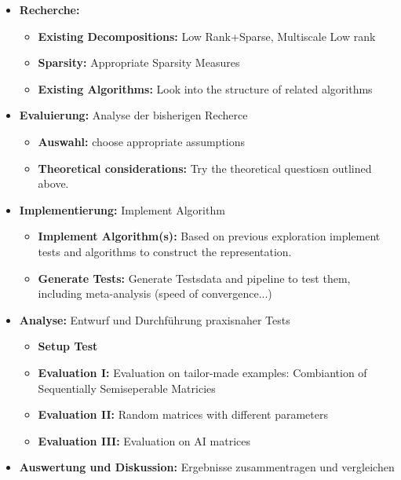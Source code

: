 \documentclass[lang=ngerman,inputenc=utf8,fontsize=10pt]{ldvarticle}
\begin{document}
\begin{itemize}
	\item \textbf{Recherche:}
	\begin{itemize}
			\item \textbf{Existing Decompositions:} Low Rank+Sparse, Multiscale Low rank \cite{chandrasekaran_sparse_2009,ong_beyond_2016,yu_compressing_2017}
			\item \textbf{Sparsity:} Appropriate Sparsity Measures \cite{ulfarsson_sparse_2015,parekh_improved_2017}
			\item \textbf{Existing Algorithms:} Look into the structure of related algorithms
		\end{itemize}
	\item \textbf{Evaluierung:} Analyse der bisherigen Recherce
		\begin{itemize}
			\item \textbf{Auswahl:} choose appropriate assumptions
			\item \textbf{Theoretical considerations:} Try the theoretical questiosn outlined above.
		\end{itemize}
	\item \textbf{Implementierung:} Implement Algorithm
		\begin{itemize}
			\item \textbf{Implement Algorithm(s):} Based on previous exploration implement tests and algorithms to construct the representation.
			\item \textbf{Generate Tests:} Generate Testsdata and pipeline to test them, including meta-analysis (speed of convergence...)
		\end{itemize}
	\item \textbf{Analyse:} Entwurf und Durchführung praxisnaher Tests
		\begin{itemize}
			\item \textbf{Setup Test}
			\item \textbf{Evaluation I:} Evaluation on tailor-made examples: Combiantion of Sequentially Semiseperable Matricies %
			\item \textbf{Evaluation II:} Random matrices with different parameters
			\item \textbf{Evaluation III:} Evaluation on AI matrices
		\end{itemize}
	\item \textbf{Auswertung und Diskussion:} Ergebnisse zusammentragen und vergleichen

\end{itemize}
\end{document}
